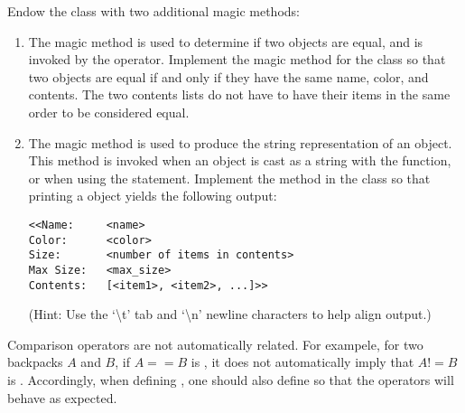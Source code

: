 \begin{problem}
Endow the  class with two additional magic methods:
\begin{enumerate}
\item The  magic method is used to determine if two objects are equal, and is invoked by the \li{==} operator.
Implement the  magic method for the  class so that two  objects are equal if and only if they have the same name, color, and contents.
The two contents lists do not have to have their items in the same order to be considered equal.

\item The  magic method is used to produce the string representation of an object.
This method is invoked when an object is cast as a string with the  function, or when using the  statement.
Implement the  method in the  class so that printing a  object yields the following output:
\begin{lstlisting}
<<Name:		<name>
Color:		<color>
Size:       <number of items in contents>
Max Size:   <max_size>
Contents:   [<item1>, <item2>, ...]>>
\end{lstlisting}
(Hint: Use the `\textbackslash{t}' tab and `\textbackslash{n}' newline characters to help align output.)
\end{enumerate}
\end{problem}

\begin{warn}
Comparison operators are not automatically related.
For exampele, for two backpacks $A$ and $B$, if $A==B$ is , it does not automatically imply that $A!=B$ is .
Accordingly, when defining , one should also define  so that the operators will behave as expected.
\end{warn}

